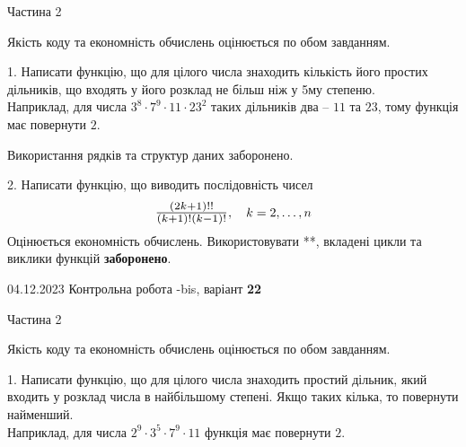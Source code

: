 \documentclass[12pt, ukrainian]{article}
\begin{document}
{{{{{{{{{{{{{{{{{{{{\begin {Huge}
\begin{center}Частина 2
\end{center}
\vspace{10mm}
\end {Huge}

{
\begin {Large}
Якість коду та економність обчислень оцінюється по обом завданням. 

\vspace{5mm}

1. Написати функцію, що для цілого числа знаходить кількість його простих дільників, що входять у його розклад не більш ніж у 5му степеню. \\ Наприклад, для числа $3^8{\cdot}7^9{\cdot}11{\cdot}23^{2}$ таких дільників два – $11$ та $23$, тому функція має повернути $2$.

 Використання рядків та структур даних заборонено. 



\vspace{10mm}



2. 
Написати функцію, що виводить послідовність чисел
$$\scalebox{1.2}{$\frac{(2k+1)!!}{(k+1)!(k-1)!}$}, \quad k=2,\ldots,n$$
Оцінюється економність обчислень. Використовувати **, вкладені цикли та виклики функцій \textbf{заборонено}.

\end{Large}\newpage




\begin {Huge}
{{04.12.2023 Контрольна робота -bis, варіант  \No \textbf { 22 }\par}}

\begin{center}Частина 2
\end{center}
\vspace{10mm}
\end {Huge}

{
\begin {Large}
Якість коду та економність обчислень оцінюється по обом завданням. 

\vspace{5mm}

1. Написати функцію, що для цілого числа знаходить простий дільник, який входить у розклад числа в найбільшому степені. Якщо таких кілька, то повернути найменший. \\ Наприклад, для числа $2^{9}{\cdot}3^5{\cdot}7^9{\cdot}11$ функція має повернути $2$.


\end{Large}}}}}}}}}}}}}}}}}}}}}}}
\end{document}
